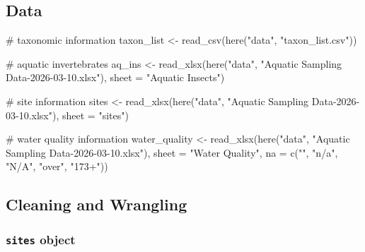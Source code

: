 \documentclass[
  letterpaper,
  DIV=11,
  numbers=noendperiod]{scrartcl}
\newenvironment{Shaded}{\begin{snugshade}}{\end{snugshade}}
\newcommand{\AttributeTok}[1]{\textcolor[rgb]{0.40,0.45,0.13}{#1}}
\newcommand{\CommentTok}[1]{\textcolor[rgb]{0.37,0.37,0.37}{#1}}
\newcommand{\FunctionTok}[1]{\textcolor[rgb]{0.28,0.35,0.67}{#1}}
\newcommand{\NormalTok}[1]{\textcolor[rgb]{0.00,0.23,0.31}{#1}}
\newcommand{\OtherTok}[1]{\textcolor[rgb]{0.00,0.23,0.31}{#1}}
\newcommand{\StringTok}[1]{\textcolor[rgb]{0.13,0.47,0.30}{#1}}
\begin{document}
\subsection{Data}\label{data}

\begin{Shaded}
\begin{Highlighting}[]
\CommentTok{\# taxonomic information}
\NormalTok{taxon\_list }\OtherTok{\textless{}{-}} \FunctionTok{read\_csv}\NormalTok{(}\FunctionTok{here}\NormalTok{(}\StringTok{"data"}\NormalTok{, }\StringTok{"taxon\_list.csv"}\NormalTok{)) }

\CommentTok{\# aquatic invertebrates}
\NormalTok{aq\_ins }\OtherTok{\textless{}{-}} \FunctionTok{read\_xlsx}\NormalTok{(}\FunctionTok{here}\NormalTok{(}\StringTok{"data"}\NormalTok{, }\StringTok{"Aquatic Sampling Data{-}2026{-}03{-}10.xlsx"}\NormalTok{),}
                    \AttributeTok{sheet =} \StringTok{"Aquatic Insects"}\NormalTok{) }

\CommentTok{\# site information}
\NormalTok{sites }\OtherTok{\textless{}{-}} \FunctionTok{read\_xlsx}\NormalTok{(}\FunctionTok{here}\NormalTok{(}\StringTok{"data"}\NormalTok{, }\StringTok{"Aquatic Sampling Data{-}2026{-}03{-}10.xlsx"}\NormalTok{),}
                   \AttributeTok{sheet =} \StringTok{"sites"}\NormalTok{)}

\CommentTok{\# water quality information}
\NormalTok{water\_quality }\OtherTok{\textless{}{-}} \FunctionTok{read\_xlsx}\NormalTok{(}\FunctionTok{here}\NormalTok{(}\StringTok{"data"}\NormalTok{, }\StringTok{"Aquatic Sampling Data{-}2026{-}03{-}10.xlsx"}\NormalTok{),}
                           \AttributeTok{sheet =} \StringTok{"Water Quality"}\NormalTok{,}
                           \AttributeTok{na =} \FunctionTok{c}\NormalTok{(}\StringTok{""}\NormalTok{, }\StringTok{"n/a"}\NormalTok{, }\StringTok{"N/A"}\NormalTok{, }\StringTok{"over"}\NormalTok{, }\StringTok{"173+"}\NormalTok{)) }
\end{Highlighting}
\end{Shaded}

\subsection{Cleaning and Wrangling}\label{cleaning-and-wrangling}

\subsubsection{\texorpdfstring{\texttt{sites}
object}{sites object}}\label{sites-object}
\end{document}
